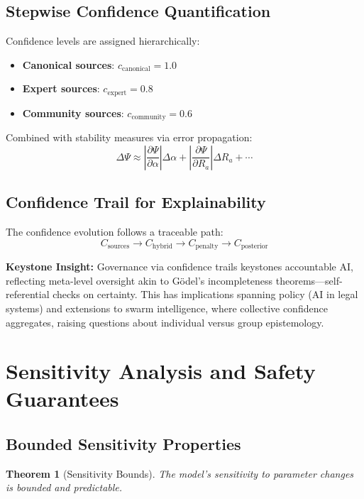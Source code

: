 \documentclass[12pt,a4paper]{article}
\newtheorem{theorem}{Theorem}[section]
\theoremstyle{definition}
\theoremstyle{remark}
\begin{document}
\subsection{Stepwise Confidence Quantification}

Confidence levels are assigned hierarchically:
\begin{itemize}
    \item \textbf{Canonical sources}: $c_{\text{canonical}} = 1.0$
    \item \textbf{Expert sources}: $c_{\text{expert}} = 0.8$
    \item \textbf{Community sources}: $c_{\text{community}} = 0.6$
\end{itemize}

Combined with stability measures via error propagation:
$$\Delta\Psi \approx \left|\frac{\partial \Psi}{\partial \alpha}\right| \Delta\alpha + \left|\frac{\partial \Psi}{\partial R_a}\right| \Delta R_a + \cdots$$

\subsection{Confidence Trail for Explainability}

The confidence evolution follows a traceable path:
$$C_{\text{sources}} \rightarrow C_{\text{hybrid}} \rightarrow C_{\text{penalty}} \rightarrow C_{\text{posterior}}$$

\begin{reflectionbox}
\textbf{Keystone Insight:} Governance via confidence trails keystones accountable AI, reflecting meta-level oversight akin to Gödel's incompleteness theorems—self-referential checks on certainty. This has implications spanning policy (AI in legal systems) and extensions to swarm intelligence, where collective confidence aggregates, raising questions about individual versus group epistemology.
\end{reflectionbox}

\section{Sensitivity Analysis and Safety Guarantees}

\subsection{Bounded Sensitivity Properties}

\begin{theorem}[Sensitivity Bounds]
The model's sensitivity to parameter changes is bounded and predictable.
\end{theorem}
\end{document}
